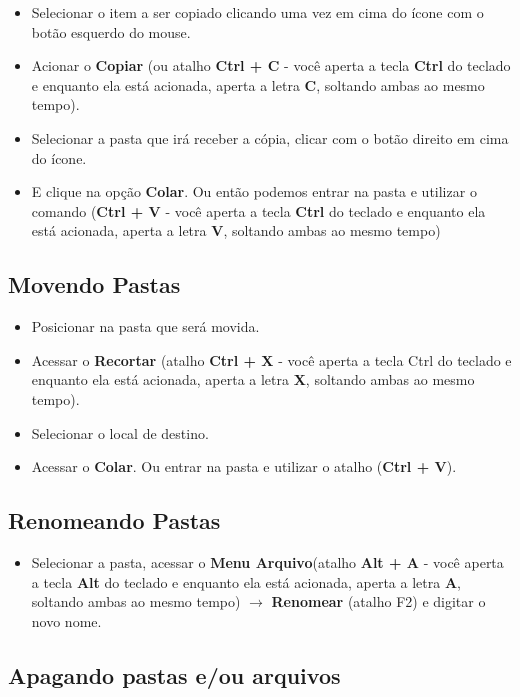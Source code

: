 \documentclass[hidelinks,12pt]{article}
\begin{document}
\begin{itemize}

	\item Selecionar o item a ser copiado clicando uma vez em cima do ícone com o botão esquerdo do mouse.
	\item Acionar o {\bf Copiar} (ou atalho {\bf Ctrl + C} - você aperta a tecla \textbf{Ctrl} do teclado e enquanto ela está acionada, aperta a letra {\bf C}, soltando ambas ao mesmo tempo).
	\item Selecionar a pasta que irá receber a cópia, clicar com o botão direito em cima do ícone.
	\item E clique na opção {\bf Colar}. Ou então podemos entrar na pasta e utilizar o comando ({\bf Ctrl + V} - você aperta a tecla {\bf Ctrl} do teclado e enquanto ela está acionada, aperta a letra {\bf V}, soltando ambas ao mesmo tempo)
\end{itemize}

\subsection{Movendo Pastas}

\begin{itemize}
	\item Posicionar na pasta que será movida.
	\item Acessar o {\bf Recortar} (atalho {\bf Ctrl + X} - você aperta a tecla Ctrl do teclado e enquanto ela está acionada, aperta a letra {\bf X}, soltando ambas ao mesmo tempo).
	\item Selecionar o local de destino.
	\item Acessar o {\bf Colar}. Ou entrar na pasta e utilizar o atalho ({\bf Ctrl + V}).
\end{itemize}

\subsection{Renomeando Pastas}

\begin{itemize}
	\item Selecionar a pasta, acessar o {\bf Menu Arquivo}(atalho {\bf Alt + A} - você aperta a tecla {\bf Alt} do teclado e enquanto ela está acionada, aperta a letra {\bf A}, soltando ambas ao mesmo tempo) $\rightarrow$ {\bf Renomear} (atalho F2) e digitar o novo nome.
\end{itemize}

\subsection{Apagando pastas e/ou arquivos}
\end{document}
